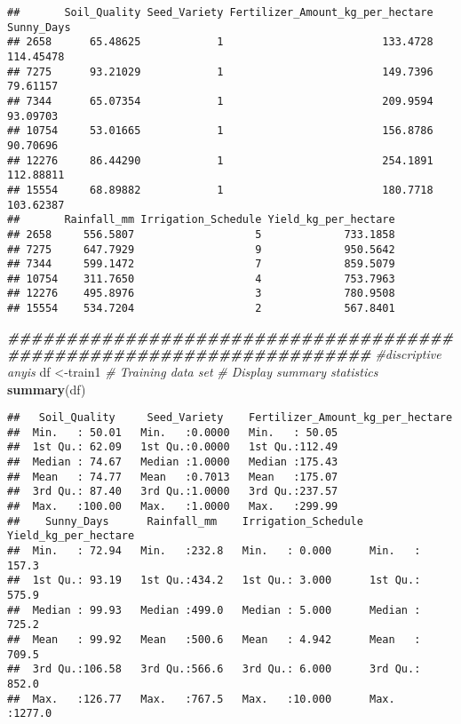 \documentclass[
]{article}
\newenvironment{Shaded}{\begin{snugshade}}{\end{snugshade}}
\newcommand{\CommentTok}[1]{\textcolor[rgb]{0.56,0.35,0.01}{\textit{#1}}}
\newcommand{\DocumentationTok}[1]{\textcolor[rgb]{0.56,0.35,0.01}{\textbf{\textit{#1}}}}
\newcommand{\FunctionTok}[1]{\textcolor[rgb]{0.13,0.29,0.53}{\textbf{#1}}}
\newcommand{\NormalTok}[1]{#1}
\newcommand{\OtherTok}[1]{\textcolor[rgb]{0.56,0.35,0.01}{#1}}
\begin{document}
\begin{verbatim}
##       Soil_Quality Seed_Variety Fertilizer_Amount_kg_per_hectare Sunny_Days
## 2658      65.48625            1                         133.4728  114.45478
## 7275      93.21029            1                         149.7396   79.61157
## 7344      65.07354            1                         209.9594   93.09703
## 10754     53.01665            1                         156.8786   90.70696
## 12276     86.44290            1                         254.1891  112.88811
## 15554     68.89882            1                         180.7718  103.62387
##       Rainfall_mm Irrigation_Schedule Yield_kg_per_hectare
## 2658     556.5807                   5             733.1858
## 7275     647.7929                   9             950.5642
## 7344     599.1472                   7             859.5079
## 10754    311.7650                   4             753.7963
## 12276    495.8976                   3             780.9508
## 15554    534.7204                   2             567.8401
\end{verbatim}

\begin{Shaded}
\begin{Highlighting}[]
\DocumentationTok{\#\#\#\#\#\#\#\#\#\#\#\#\#\#\#\#\#\#\#\#\#\#\#\#\#\#\#\#\#\#\#\#\#\#\#\#\#\#\#\#\#\#\#\#\#\#\#\#\#\#\#\#\#\#\#\#\#\#\#\#\#\#\#\#\#\#\#\#\#}
\CommentTok{\#discriptive anyis}
\NormalTok{df }\OtherTok{\textless{}{-}}\NormalTok{train1 }\CommentTok{\# Training data set}
\CommentTok{\# Display summary statistics}
\FunctionTok{summary}\NormalTok{(df)}
\end{Highlighting}
\end{Shaded}

\begin{verbatim}
##   Soil_Quality     Seed_Variety    Fertilizer_Amount_kg_per_hectare
##  Min.   : 50.01   Min.   :0.0000   Min.   : 50.05                  
##  1st Qu.: 62.09   1st Qu.:0.0000   1st Qu.:112.49                  
##  Median : 74.67   Median :1.0000   Median :175.43                  
##  Mean   : 74.77   Mean   :0.7013   Mean   :175.07                  
##  3rd Qu.: 87.40   3rd Qu.:1.0000   3rd Qu.:237.57                  
##  Max.   :100.00   Max.   :1.0000   Max.   :299.99                  
##    Sunny_Days      Rainfall_mm    Irrigation_Schedule Yield_kg_per_hectare
##  Min.   : 72.94   Min.   :232.8   Min.   : 0.000      Min.   : 157.3      
##  1st Qu.: 93.19   1st Qu.:434.2   1st Qu.: 3.000      1st Qu.: 575.9      
##  Median : 99.93   Median :499.0   Median : 5.000      Median : 725.2      
##  Mean   : 99.92   Mean   :500.6   Mean   : 4.942      Mean   : 709.5      
##  3rd Qu.:106.58   3rd Qu.:566.6   3rd Qu.: 6.000      3rd Qu.: 852.0      
##  Max.   :126.77   Max.   :767.5   Max.   :10.000      Max.   :1277.0
\end{verbatim}
\end{document}
